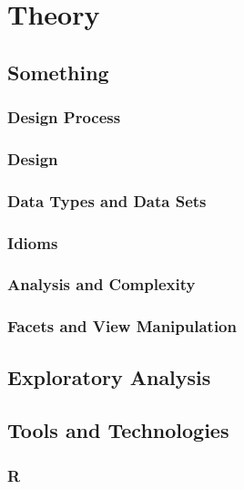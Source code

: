 \documentclass[a4paper,12pt]{article}
\begin{document}
\section{Theory} %

\subsection{Something} %
\subsubsection{Design Process} %

\subsubsection{Design} %

\subsubsection{Data Types and Data Sets} %

\subsubsection{Idioms} %

\subsubsection{Analysis and Complexity} %

\subsubsection{Facets and View Manipulation} %


\subsection{Exploratory Analysis} %

\subsection{Tools and Technologies} %
\subsubsection{R} %
\end{document}
